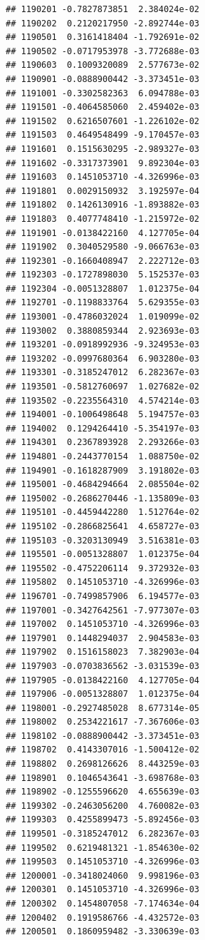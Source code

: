 \documentclass[ignorenonframetext,]{beamer}
\begin{document}
\begin{frame}[fragile]
\begin{verbatim}
## 1190201 -0.7827873851  2.384024e-02
## 1190202  0.2120217950 -2.892744e-03
## 1190501  0.3161418404 -1.792691e-02
## 1190502 -0.0717953978 -3.772688e-03
## 1190603  0.1009320089  2.577673e-02
## 1190901 -0.0888900442 -3.373451e-03
## 1191001 -0.3302582363  6.094788e-03
## 1191501 -0.4064585060  2.459402e-03
## 1191502  0.6216507601 -1.226102e-02
## 1191503  0.4649548499 -9.170457e-03
## 1191601  0.1515630295 -2.989327e-03
## 1191602 -0.3317373901  9.892304e-03
## 1191603  0.1451053710 -4.326996e-03
## 1191801  0.0029150932  3.192597e-04
## 1191802  0.1426130916 -1.893882e-03
## 1191803  0.4077748410 -1.215972e-02
## 1191901 -0.0138422160  4.127705e-04
## 1191902  0.3040529580 -9.066763e-03
## 1192301 -0.1660408947  2.222712e-03
## 1192303 -0.1727898030  5.152537e-03
## 1192304 -0.0051328807  1.012375e-04
## 1192701 -0.1198833764  5.629355e-03
## 1193001 -0.4786032024  1.019099e-02
## 1193002  0.3880859344  2.923693e-03
## 1193201 -0.0918992936 -9.324953e-03
## 1193202 -0.0997680364  6.903280e-03
## 1193301 -0.3185247012  6.282367e-03
## 1193501 -0.5812760697  1.027682e-02
## 1193502 -0.2235564310  4.574214e-03
## 1194001 -0.1006498648  5.194757e-03
## 1194002  0.1294264410 -5.354197e-03
## 1194301  0.2367893928  2.293266e-03
## 1194801 -0.2443770154  1.088750e-02
## 1194901 -0.1618287909  3.191802e-03
## 1195001 -0.4684294664  2.085504e-02
## 1195002 -0.2686270446 -1.135809e-03
## 1195101 -0.4459442280  1.512764e-02
## 1195102 -0.2866825641  4.658727e-03
## 1195103 -0.3203130949  3.516381e-03
## 1195501 -0.0051328807  1.012375e-04
## 1195502 -0.4752206114  9.372932e-03
## 1195802  0.1451053710 -4.326996e-03
## 1196701 -0.7499857906  6.194577e-03
## 1197001 -0.3427642561 -7.977307e-03
## 1197002  0.1451053710 -4.326996e-03
## 1197901  0.1448294037  2.904583e-03
## 1197902  0.1516158023  7.382903e-04
## 1197903 -0.0703836562 -3.031539e-03
## 1197905 -0.0138422160  4.127705e-04
## 1197906 -0.0051328807  1.012375e-04
## 1198001 -0.2927485028  8.677314e-05
## 1198002  0.2534221617 -7.367606e-03
## 1198102 -0.0888900442 -3.373451e-03
## 1198702  0.4143307016 -1.500412e-02
## 1198802  0.2698126626  8.443259e-03
## 1198901  0.1046543641 -3.698768e-03
## 1198902 -0.1255596620  4.655639e-03
## 1199302 -0.2463056200  4.760082e-03
## 1199303  0.4255899473 -5.892456e-03
## 1199501 -0.3185247012  6.282367e-03
## 1199502  0.6219481321 -1.854630e-02
## 1199503  0.1451053710 -4.326996e-03
## 1200001 -0.3418024060  9.998196e-03
## 1200301  0.1451053710 -4.326996e-03
## 1200302  0.1454807058 -7.174634e-04
## 1200402  0.1919586766 -4.432572e-03
## 1200501  0.1860959482 -3.330639e-03

\end{verbatim}
\end{frame}
\end{document}
